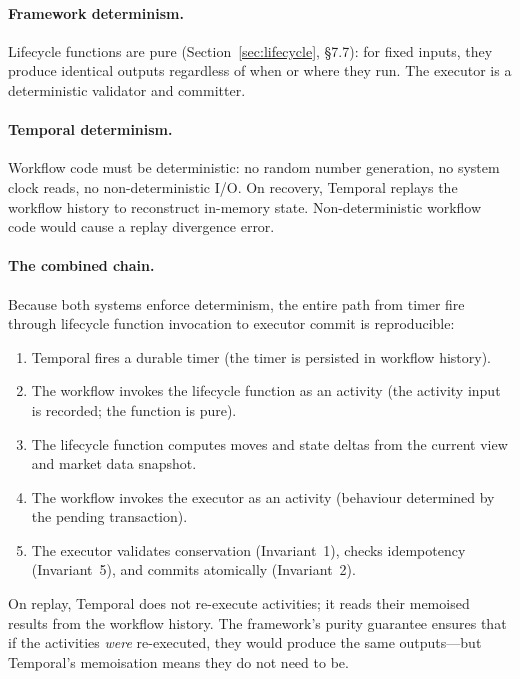 \documentclass[11pt,a4paper]{article}
\begin{document}
\paragraph{Framework determinism.}
Lifecycle functions are pure (Section~\ref{sec:lifecycle}, \S7.7): for fixed inputs, they produce identical outputs regardless of when or where they run. The executor is a deterministic validator and committer.

\paragraph{Temporal determinism.}
Workflow code must be deterministic: no random number generation, no system clock reads, no non-deterministic I/O. On recovery, Temporal replays the workflow history to reconstruct in-memory state. Non-deterministic workflow code would cause a replay divergence error.

\paragraph{The combined chain.}
Because both systems enforce determinism, the entire path from timer fire through lifecycle function invocation to executor commit is reproducible:

\begin{enumerate}[nosep]
\item Temporal fires a durable timer (the timer is persisted in workflow history).
\item The workflow invokes the lifecycle function as an activity (the activity input is recorded; the function is pure).
\item The lifecycle function computes moves and state deltas from the current view and market data snapshot.
\item The workflow invokes the executor as an activity (behaviour determined by the pending transaction).
\item The executor validates conservation (Invariant~1), checks idempotency (Invariant~5), and commits atomically (Invariant~2).
\end{enumerate}

\noindent On replay, Temporal does not re-execute activities; it reads their memoised results from the workflow history. The framework's purity guarantee ensures that if the activities \emph{were} re-executed, they would produce the same outputs---but Temporal's memoisation means they do not need to be.

\end{document}
